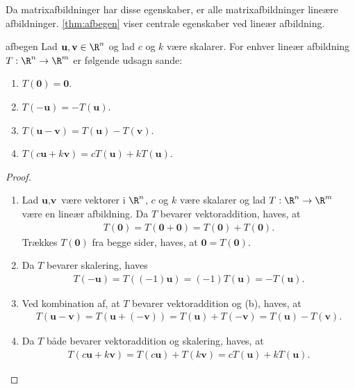 \noindent
%
Da matrixafbildninger har disse egenskaber, er alle matrixafbildninger lineære afbildninger.
\ref{thm:afbegen} viser centrale egenskaber ved lineær afbildning.
\newpage 
\begin{thm}{}{afbegen}
Lad $\textbf{u}, \textbf{v} \in \R^n$ og lad $c$ og $k$ være skalarer.
For enhver lineær afbildning $T: \R^n \rightarrow \R^m$ er følgende udsagn sande:
\begin{enumerate}[label = (\alph*)]
\item $T(\textbf{0}) = \textbf{0}$.
\item $T(-\textbf{u}) = -T(\textbf{u})$.
\item $T(\textbf{u}-\textbf{v}) = T(\textbf{u})-T(\textbf{v})$.
\item $T(c\textbf{u} + k\textbf{v}) = cT(\textbf{u}) + kT(\textbf{u})$.
\end{enumerate}
\end{thm}
%
\begin{proof}
\begin{enumerate}[label=(\alph*)]
\item Lad $\textbf{u}, \textbf{v}$ være vektorer i $\R^n$, $c$ og $k$ være skalarer og lad $T: \R^n \rightarrow \R^m$ være en lineær afbildning.
Da $T$ bevarer vektoraddition, haves, at
%
\begin{align*}
T(\textbf{0}) = T(\textbf{0} + \textbf{0}) = T(\textbf{0}) + T(\textbf{0}).
\end{align*}
%
Trækkes $T(\textbf{0})$ fra begge sider, haves, at $\textbf{0} = T(\textbf{0})$.\\
%
\item Da $T$ bevarer skalering, haves
% 
\begin{align*}
T(-\textbf{u}) = T((-1)\textbf{u}) = (-1)T(\textbf{u}) = -T(\textbf{u}).
\end{align*}
%
\item Ved kombination af, at $T$ bevarer vektoraddition og (b), haves, at
%
\begin{align*}
T(\textbf{u}-\textbf{v}) = T(\textbf{u}+(-\textbf{v})) = T(\textbf{u})+T(-\textbf{v}) = T(\textbf{u}) - T(\textbf{v}).
\end{align*}
%
\item Da $T$ både bevarer vektoraddition og skalering, haves, at 
%
\begin{align*}
T(c\textbf{u} + k\textbf{v}) = T(c\textbf{u}) + T(k\textbf{v}) = cT(\textbf{u}) + kT(\textbf{u}).
\end{align*}
%
\end{enumerate}
\end{proof}
